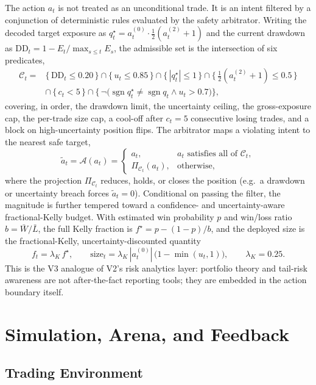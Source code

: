 \documentclass[10pt]{article}
\begin{document}
The action \(a_t\) is not treated as an unconditional trade. It is an intent filtered by a
conjunction of deterministic rules evaluated by the safety arbitrator. Writing the decoded
target exposure as \(q^{\star}_t=a_t^{(0)}\cdot\tfrac12(a_t^{(2)}+1)\) and the current
drawdown as \(\mathrm{DD}_t=1-E_t/\max_{s\le t}E_s\), the admissible set is the intersection of
six predicates,
\[
	\begin{aligned}
		\mathcal{C}_t=
		 & \bigl\{\,\mathrm{DD}_t\le 0.20\,\bigr\}\cap
		\bigl\{\,u_t\le 0.85\,\bigr\}\cap
		\bigl\{\,|q^{\star}_t|\le 1\,\bigr\}\cap
		\bigl\{\,\tfrac12(a_t^{(2)}+1)\le 0.5\,\bigr\}                                            \\
		 & \cap\,\bigl\{\,c_t< 5\,\bigr\}\cap
		\bigl\{\,\neg\bigl(\operatorname{sgn}q^{\star}_t\neq\operatorname{sgn}q_t \wedge u_t>0.7\bigr)\bigr\},
	\end{aligned}
\]
covering, in order, the drawdown limit, the uncertainty ceiling, the gross-exposure cap, the
per-trade size cap, a cool-off after \(c_t=5\) consecutive losing trades, and a block on
high-uncertainty position flips. The arbitrator maps a violating intent to the nearest safe
target,
\[
	\tilde a_t=\mathcal{A}(a_t)=
	\begin{cases}
		a_t, & a_t \text{ satisfies all of } \mathcal{C}_t,\\
		\Pi_{\mathcal{C}_t}(a_t), & \text{otherwise,}
	\end{cases}
\]
where the projection \(\Pi_{\mathcal{C}_t}\) reduces, holds, or closes the position (e.g.\ a
drawdown or uncertainty breach forces \(\tilde a_t=0\)). Conditional on passing the filter, the
magnitude is further tempered toward a confidence- and uncertainty-aware fractional-Kelly
budget. With estimated win probability \(p\) and win/loss ratio \(b=\bar{W}/\bar{L}\), the full
Kelly fraction is \(f^{\star}=p-(1-p)/b\), and the deployed size is the fractional-Kelly,
uncertainty-discounted quantity
\[
	f_t=\lambda_K\,f^{\star},\qquad
	\text{size}_t=\lambda_K\,|a_t^{(0)}|\,\bigl(1-\min(u_t,1)\bigr),
	\qquad \lambda_K=0.25.
\]
This is the V3 analogue of V2's risk analytics layer: portfolio theory and tail-risk awareness
are not after-the-fact reporting tools; they are embedded in the action boundary itself.

\section{Simulation, Arena, and Feedback}

\subsection{Trading Environment}
\end{document}
